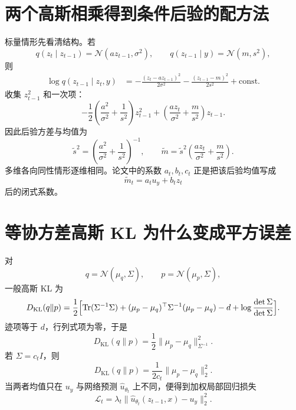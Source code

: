 \documentclass[UTF8,12pt,a4paper,fontset=none]{ctexart}
\numberwithin{equation}{section}
\newcommand{\Loss}{\mathcal{L}}
\newcommand{\tr}{\operatorname{Tr}}
\newcommand{\KL}{D_{\mathrm{KL}}}
\begin{document}
\section{两个高斯相乘得到条件后验的配方法}
标量情形先看清结构。若
\begin{equation}
 q(z_t\mid z_{t-1})=\mathcal N(az_{t-1},\sigma^2),
 \qquad
 q(z_{t-1}\mid y)=\mathcal N(m,s^2),
\end{equation}
则
\begin{align}
 \log q(z_{t-1}\mid z_t,y)
 &=-\frac{(z_t-az_{t-1})^2}{2\sigma^2}
 -\frac{(z_{t-1}-m)^2}{2s^2}+\mathrm{const}.
\end{align}
收集 $z_{t-1}^2$ 和一次项：
\begin{equation}
 -\frac12\left(\frac{a^2}{\sigma^2}+\frac1{s^2}\right)z_{t-1}^2
 +\left(\frac{az_t}{\sigma^2}+\frac{m}{s^2}\right)z_{t-1}.
\end{equation}
因此后验方差与均值为
\begin{equation}
 \tilde s^2=\left(\frac{a^2}{\sigma^2}+\frac1{s^2}\right)^{-1},
 \qquad
 \tilde m=\tilde s^2\left(\frac{az_t}{\sigma^2}+\frac{m}{s^2}\right).
\end{equation}
多维各向同性情形逐维相同。论文中的系数 $a_t,b_t,c_t$ 正是把该后验均值写成
\begin{equation}
 \tilde m_t=a_tu_y+b_tz_t
\end{equation}
后的闭式系数。

\section{等协方差高斯 KL 为什么变成平方误差}
对
\begin{equation}
 q=\mathcal N(\mu_q,\Sigma),\qquad
 p=\mathcal N(\mu_p,\Sigma),
\end{equation}
一般高斯 KL 为
\begin{align}
 \KL(q\|p)=\frac12\Bigl[
 \tr(\Sigma^{-1}\Sigma)
 +(\mu_p-\mu_q)^\top\Sigma^{-1}(\mu_p-\mu_q)
 -d+\log\frac{\det\Sigma}{\det\Sigma}
 \Bigr].
\end{align}
迹项等于 $d$，行列式项为零，于是
\begin{equation}
 \KL(q\|p)=\frac12
 \|\mu_p-\mu_q\|_{\Sigma^{-1}}^2.
\end{equation}
若 $\Sigma=c_tI$，则
\begin{equation}
 \KL(q\|p)=\frac1{2c_t}\|\mu_p-\mu_q\|_2^2.
\end{equation}
当两者均值只在 $u_y$ 与网络预测 $\hat u_{\theta_t}$ 上不同，便得到加权局部回归损失
\begin{equation}
 \Loss_t=\lambda_t\|\hat u_{\theta_t}(z_{t-1},x)-u_y\|_2^2.
\end{equation}
\end{document}
